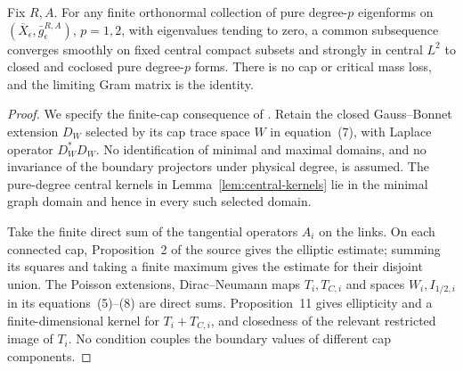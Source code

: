 \begin{proposition}\label{prop:multicap-compactness}
Fix $R,A$. For any finite orthonormal collection of pure degree-$p$
eigenforms on $(\overline X_\epsilon,\bar g_\epsilon^{R,A})$, $p=1,2$,
with eigenvalues tending to zero, a common subsequence converges smoothly
on fixed central compact subsets and strongly in central $L^2$ to closed
and coclosed pure degree-$p$ forms. There is no cap or critical mass loss,
and the limiting Gram matrix is the identity.
\end{proposition}
\begin{proof}
We specify the finite-cap consequence of \cite{anne-takahashi}. Retain
the closed Gauss--Bonnet extension $D_W$ selected by its cap trace space
$W$ in equation~(7), with Laplace operator $D_W^*D_W$. No identification of minimal and maximal domains, and no
invariance of the boundary projectors under physical degree, is assumed.
The pure-degree central kernels in Lemma~\ref{lem:central-kernels} lie
in the minimal graph domain and hence in every such selected domain.

Take the finite direct sum of the tangential operators $A_i$ on the links.
On each connected cap, Proposition~2 of the source gives the elliptic
estimate; summing its squares and taking a finite maximum gives the
estimate for their disjoint union. The Poisson extensions, Dirac--Neumann
maps $T_i,T_{C,i}$ and spaces $W_i,I_{1/2,i}$ in its equations~(5)--(8)
are direct sums. Proposition~11 gives ellipticity and a finite-dimensional kernel for
$T_i+T_{C,i}$, and closedness of the relevant restricted image of $T_i$. No condition
couples the boundary values of different cap components.


\end{proof}
